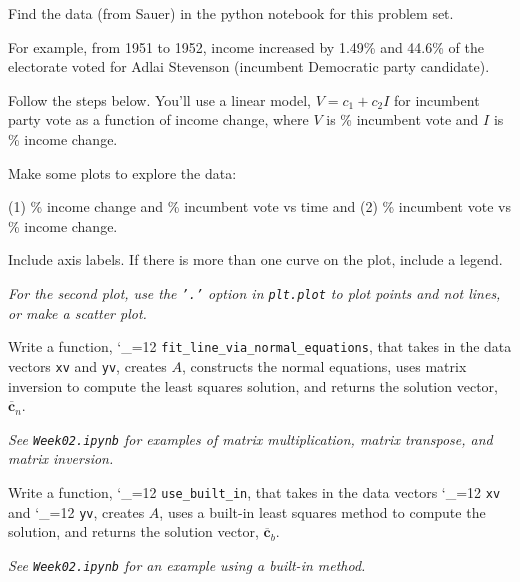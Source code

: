 \documentclass[12pt,letterpaper,noanswers]{exam}
\makeatletter
\newcommand{\mathbf}[1]{\boldsymbol{#1}}
\newcommand{\pyf}{%
  \begingroup\catcode`_=12
  \pyf@
}
\newcommand{\pyf@}[1]{\texttt{#1}\endgroup}
\makeatother
\begin{document}
\begin{questions}
Find the data (from Sauer) in the python notebook for this problem set.


For example, from 1951 to 1952, income increased by 1.49\% and 44.6\% of the electorate voted for Adlai Stevenson (incumbent Democratic party candidate).

Follow the steps below.  You'll use a linear model, $V = c_1 + c_2 I$ for incumbent party vote as a function of income change, where $V$ is \% incumbent vote and $I$ is \% income change.



\begin{parts}
\item Make some plots to explore the data:

(1) \% income change and \% incumbent vote vs time and (2) \% incumbent vote vs \% income change.  

Include axis labels.  If there is more than one curve on the plot, include a legend.


\emph{For the second plot, use the \texttt{'.'} option in \texttt{plt.plot} to plot points and not lines, or make a scatter plot.}

\item Write a function, \pyf{fit_line_via_normal_equations}, that takes in the data vectors \texttt{xv} and \texttt{yv}, creates $A$, constructs the normal equations, uses matrix inversion to compute the least squares solution, and returns the solution vector, $\overline{\mathbf{c}}_n$.

\emph{See \texttt{Week02.ipynb} for examples of matrix multiplication, matrix transpose, and matrix inversion.}

\item Write a function, \pyf{use_built_in}, that takes in the data vectors \pyf{xv} and \pyf{yv}, creates $A$, uses a built-in least squares method to compute the solution, and returns the solution vector, $\overline{\mathbf{c}}_b$.

\emph{See \texttt{Week02.ipynb} for an example using a built-in method.}


\end{parts}
\end{questions}
\end{document}
